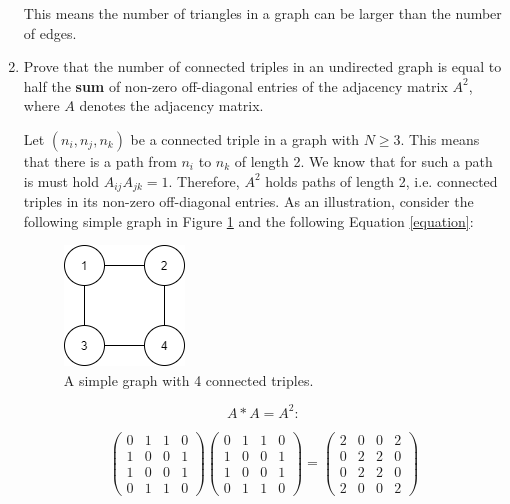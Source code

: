 \begin{enumerate}
	This means the number of triangles in a graph can be larger than the number of edges.
	
	\item Prove that the number of connected triples in an undirected graph is equal to half the \textbf{sum} of non-zero off-diagonal entries of the adjacency matrix $A^2$, where $A$ denotes the adjacency matrix.
	
	Let $(n_i, n_j, n_k)$ be a connected triple in a graph with $N \ge 3$. This means that there is a path from $n_i$ to $n_k$ of length 2. We know that for such a path is must hold $A_{ij}A_{jk} = 1$. Therefore, $A^2$ holds paths of length 2, i.e. connected triples in its non-zero off-diagonal entries. As an illustration, consider the following simple graph in Figure \ref{triples} and the following Equation \ref{equation}:
	
	\begin{figure}[h]
		\centering
		\includegraphics[width=0.25\linewidth]{images/triples.png}
		\caption{A simple graph with 4 connected triples.}
		\label{triples}
	\end{figure}

	\begin{equation*}
		A * A = A^2:
	\end{equation*}
	
	\begin{equation*} \label{equation}
		\begin{pmatrix}
			0 & 1 & 1 & 0\\
			1 & 0 & 0 & 1\\
			1 & 0 & 0 & 1\\
			0 & 1 & 1 & 0
		\end{pmatrix}
		\begin{pmatrix}
			0 & 1 & 1 & 0\\
			1 & 0 & 0 & 1\\
			1 & 0 & 0 & 1\\
			0 & 1 & 1 & 0
		\end{pmatrix} = 
		\begin{pmatrix}
			2 & 0 & 0 & 2\\
			0 & 2 & 2 & 0\\
			0 & 2 & 2 & 0\\
			2 & 0 & 0 & 2
		\end{pmatrix}
	\end{equation*}


\end{enumerate}
